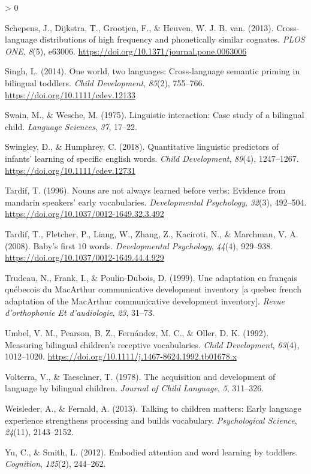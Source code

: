 \documentclass[
  english,
  ,man,floatsintext]{apa6}
\newlength{\cslhangindent}
\newenvironment{CSLReferences}[2] %
 {%
  \setlength{\parindent}{0pt}
  \ifodd #1 \everypar{\setlength{\hangindent}{\cslhangindent}}\ignorespaces\fi
  \ifnum #2 > 0
  \setlength{\parskip}{#2\baselineskip}
  \fi
 }%
 {}
\begin{document}
\begin{CSLReferences}{1}{0}
\leavevmode\hypertarget{ref-Schepens_etal_2013}{}%
Schepens, J., Dijkstra, T., Grootjen, F., \& Heuven, W. J. B. van. (2013). Cross-language distributions of high frequency and phonetically similar cognates. \emph{PLOS ONE}, \emph{8}(5), e63006. \url{https://doi.org/10.1371/journal.pone.0063006}

\leavevmode\hypertarget{ref-Singh_2014}{}%
Singh, L. (2014). One world, two languages: Cross-language semantic priming in bilingual toddlers. \emph{Child Development}, \emph{85}(2), 755--766. \url{https://doi.org/10.1111/cdev.12133}

\leavevmode\hypertarget{ref-Swain_Wesche_1975}{}%
Swain, M., \& Wesche, M. (1975). Linguistic interaction: Case study of a bilingual child. \emph{Language Sciences}, \emph{37}, 17--22.

\leavevmode\hypertarget{ref-Swingley_Humphrey_2018}{}%
Swingley, D., \& Humphrey, C. (2018). Quantitative linguistic predictors of infants' learning of specific english words. \emph{Child Development}, \emph{89}(4), 1247--1267. \url{https://doi.org/10.1111/cdev.12731}

\leavevmode\hypertarget{ref-Tardif_1996}{}%
Tardif, T. (1996). Nouns are not always learned before verbs: Evidence from mandarin speakers' early vocabularies. \emph{Developmental Psychology}, \emph{32}(3), 492--504. \url{https://doi.org/10.1037/0012-1649.32.3.492}

\leavevmode\hypertarget{ref-Tardif_etal_2008}{}%
Tardif, T., Fletcher, P., Liang, W., Zhang, Z., Kaciroti, N., \& Marchman, V. A. (2008). Baby's first 10 words. \emph{Developmental Psychology}, \emph{44}(4), 929--938. \url{https://doi.org/10.1037/0012-1649.44.4.929}

\leavevmode\hypertarget{ref-Trudeau_etal_1999}{}%
Trudeau, N., Frank, I., \& Poulin-Dubois, D. (1999). Une adaptation en français québecois du MacArthur communicative development inventory {[}a quebec french adaptation of the MacArthur communicative development inventory{]}. \emph{Revue d'orthophonie Et d'audiologie}, \emph{23}, 31--73.

\leavevmode\hypertarget{ref-Umbel_etal_1992}{}%
Umbel, V. M., Pearson, B. Z., Fernández, M. C., \& Oller, D. K. (1992). Measuring bilingual children's receptive vocabularies. \emph{Child Development}, \emph{63}(4), 1012--1020. \url{https://doi.org/10.1111/j.1467-8624.1992.tb01678.x}

\leavevmode\hypertarget{ref-Volterra_Taeschner_1978}{}%
Volterra, V., \& Taeschner, T. (1978). The acquisition and development of language by bilingual children. \emph{Journal of Child Language}, \emph{5}, 311--326.

\leavevmode\hypertarget{ref-Weisleder_Fernald_2013}{}%
Weisleder, A., \& Fernald, A. (2013). Talking to children matters: Early language experience strengthens processing and builds vocabulary. \emph{Psychological Science}, \emph{24}(11), 2143--2152.

\leavevmode\hypertarget{ref-Yu_Smith_2012}{}%
Yu, C., \& Smith, L. (2012). Embodied attention and word learning by toddlers. \emph{Cognition}, \emph{125}(2), 244--262.

\end{CSLReferences}

\endgroup
\end{document}
